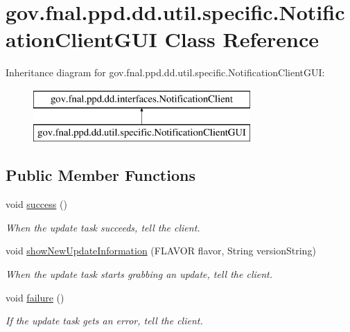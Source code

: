 \hypertarget{classgov_1_1fnal_1_1ppd_1_1dd_1_1util_1_1specific_1_1NotificationClientGUI}{\section{gov.\-fnal.\-ppd.\-dd.\-util.\-specific.\-Notification\-Client\-G\-U\-I Class Reference}
\label{classgov_1_1fnal_1_1ppd_1_1dd_1_1util_1_1specific_1_1NotificationClientGUI}
}
Inheritance diagram for gov.\-fnal.\-ppd.\-dd.\-util.\-specific.\-Notification\-Client\-G\-U\-I\-:\begin{figure}[H]
\begin{center}
\leavevmode
\includegraphics[height=2.000000cm]{classgov_1_1fnal_1_1ppd_1_1dd_1_1util_1_1specific_1_1NotificationClientGUI}
\end{center}
\end{figure}
\subsection*{Public Member Functions}
\begin{DoxyCompactItemize}
\item 
void \hyperlink{classgov_1_1fnal_1_1ppd_1_1dd_1_1util_1_1specific_1_1NotificationClientGUI_a4b11dc1662b8cd3e6b4816a60adc2000}{success} ()
\begin{DoxyCompactList}\small\item\em When the update task succeeds, tell the client. \end{DoxyCompactList}\item 
void \hyperlink{classgov_1_1fnal_1_1ppd_1_1dd_1_1util_1_1specific_1_1NotificationClientGUI_a373fcb7ff3d7811e0113ec46ad361208}{show\-New\-Update\-Information} (F\-L\-A\-V\-O\-R flavor, String version\-String)
\begin{DoxyCompactList}\small\item\em When the update task starts grabbing an update, tell the client. \end{DoxyCompactList}\item 
void \hyperlink{classgov_1_1fnal_1_1ppd_1_1dd_1_1util_1_1specific_1_1NotificationClientGUI_a461ff133d0a5f8b53a65c84181a2c631}{failure} ()
\begin{DoxyCompactList}\small\item\em If the update task gets an error, tell the client. \end{DoxyCompactList}\end{DoxyCompactItemize}


